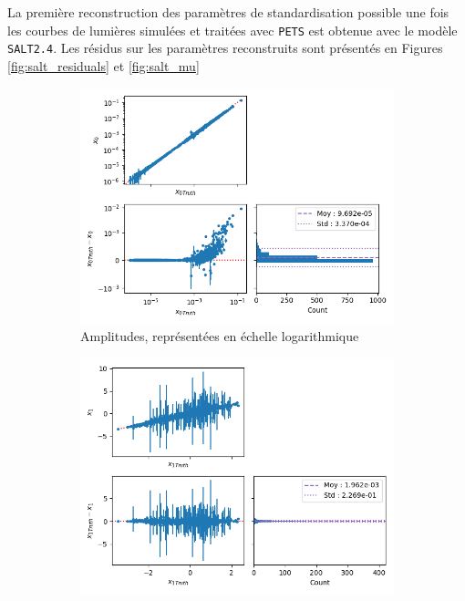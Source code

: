 \documentclass{book}
\def\pets{\texttt{PETS}\xspace}
\def\saltd{\texttt{SALT2.4}\xspace}
\begin{document}
La première reconstruction des paramètres de standardisation possible une fois les courbes de lumières simulées et traitées avec \pets est obtenue avec le modèle \saltd. Les résidus sur les paramètres reconstruits sont présentés en Figures \ref{fig:salt_residuals} et \ref{fig:salt_mu}

\begin{figure}[h]
	\centering
	\begin{subfigure}{0.45\textwidth}
		\centering
		\includegraphics[width=\textwidth]{figures/salt_x0.png}
		\caption{Amplitudes, représentées en échelle logarithmique}
		\label{fig:salt_x0}
	\end{subfigure}
	\hfill
	\begin{subfigure}{0.45\textwidth}
		\centering
		\includegraphics[width=\textwidth]{figures/salt_x1.png}

\end{subfigure}
\end{figure}
\end{document}
